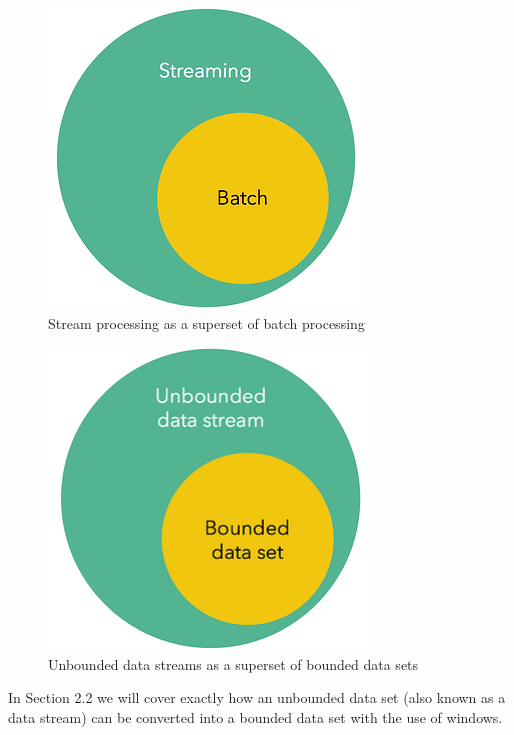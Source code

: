 \begin{figure}[!htb]
    \begin{center}
      \includegraphics[scale=0.7]{figures/streaming-subset-batch.png}
      \caption{Stream processing as a superset of batch processing}
      \label{fig:stream-superset}
    \end{center}
\end{figure}

\begin{figure}[!htb]
    \begin{center}
      \includegraphics[scale=0.7]{figures/unbounded-superset-bounded.png}
      \caption{Unbounded data streams as a superset of bounded data sets}
      \label{fig:unbounded-bounded-superset}
    \end{center}
\end{figure}


In Section 2.2 we will cover exactly how an unbounded data set (also known as a data stream) can be converted into a bounded data set with the use of windows.


